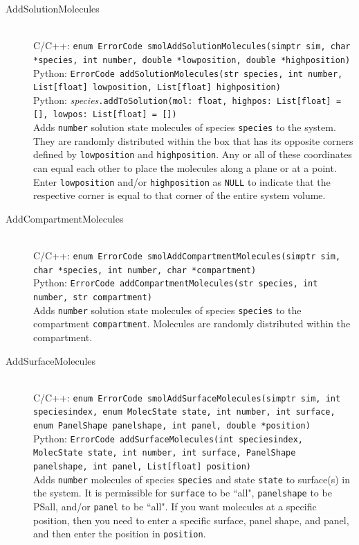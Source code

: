 \documentclass {scrbook}
\newcommand {\ttt} {\texttt}
\begin{document}
\begin{description}
\item[AddSolutionMolecules]
\hfill \\
C/C++: \ttt{enum ErrorCode smolAddSolutionMolecules(simptr sim, char *species, int number, double *lowposition, double *highposition)}\\
Python: \ttt{ErrorCode addSolutionMolecules(str species, int number, List[float] lowposition, List[float] highposition)}\\
Python: \textit{species}\ttt{.addToSolution(mol: float, highpos: List[float] = [], lowpos: List[float] = [])}\\
Adds \ttt{number} solution state molecules of species \ttt{species} to the system. They are randomly distributed within the box that has its opposite corners defined by \ttt{lowposition} and \ttt{highposition}. Any or all of these coordinates can equal each other to place the molecules along a plane or at a point. Enter \ttt{lowposition} and/or \ttt{highposition} as \ttt{NULL} to indicate that the respective corner is equal to that corner of the entire system volume.

\item[AddCompartmentMolecules]
\hfill \\
C/C++: \ttt{enum ErrorCode smolAddCompartmentMolecules(simptr sim, char *species, int number, char *compartment)}\\
Python: \ttt{ErrorCode addCompartmentMolecules(str species, int number, str compartment)}\\
Adds \ttt{number} solution state molecules of species \ttt{species} to the compartment \ttt{compartment}. Molecules are randomly distributed within the compartment.

\item[AddSurfaceMolecules]
\hfill \\
C/C++: \ttt{enum ErrorCode smolAddSurfaceMolecules(simptr sim, int speciesindex, enum MolecState state, int number, int surface, enum PanelShape panelshape, int panel, double *position)}\\
Python: \ttt{ErrorCode addSurfaceMolecules(int speciesindex, MolecState state, int number, int surface, PanelShape panelshape, int panel, List[float] position)}\\
Adds \ttt{number} molecules of species \ttt{species} and state \ttt{state} to surface(s) in the system. It is permissible for \ttt{surface} to be ``all", \ttt{panelshape} to be PSall, and/or \ttt{panel} to be ``all". If you want molecules at a specific position, then you need to enter a specific surface, panel shape, and panel, and then enter the position in \ttt{position}.


\end{description}
\end{document}
